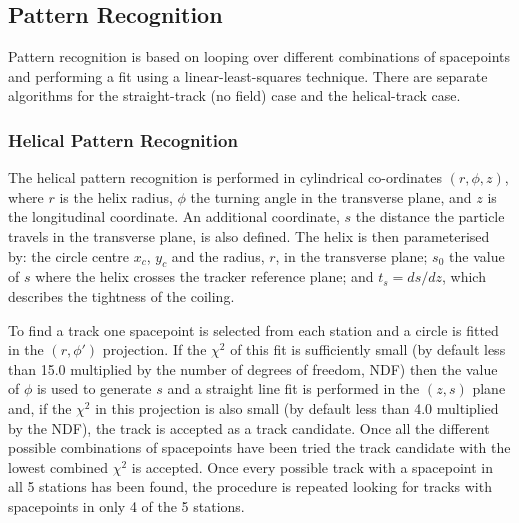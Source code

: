 
  \subsection{Pattern Recognition}
  \label{subsec:PatternRecognition}

  Pattern recognition is based on looping over different combinations of spacepoints and performing a fit using a linear-least-squares technique. There are separate algorithms for the straight-track (no field) case and the helical-track case.

   \subsubsection{Helical Pattern Recognition}
   \label{subsubsec:HelicalPatternRecognition}

   
   The helical pattern recognition is performed in cylindrical co-ordinates $(r, \phi, z)$, where $r$ is the helix radius, $\phi$ the turning angle in the transverse plane, and $z$ is the longitudinal coordinate. An additional coordinate, $s$ the distance the particle travels in the transverse plane, is also defined. The helix is then parameterised by: the circle centre $x_c$, $y_c$ and the radius, $r$, in the transverse plane; $s_0$ the value of $s$ where the helix crosses the tracker reference plane; and $t_s = ds/dz$, which describes the tightness of the coiling. %

   To find a track one spacepoint is selected from each station and a circle is fitted in the $(r, \phi')$ projection. If the $\chi^2$ of this fit is sufficiently small (by default less than 15.0 multiplied by the number of degrees of freedom, NDF) then the value of $\phi$ is used to generate $s$ and a straight line fit is performed in the $(z,s)$ plane and, if the $\chi^2$ in this projection is also small (by default less than 4.0 multiplied by the NDF), the track is accepted as a track candidate. Once all the different possible combinations of spacepoints have been tried the track candidate with the lowest combined $\chi^2$ is accepted. Once every possible track with a spacepoint in all 5 stations has been found, the procedure is repeated looking for tracks with spacepoints in only 4 of the 5 stations. %
   
